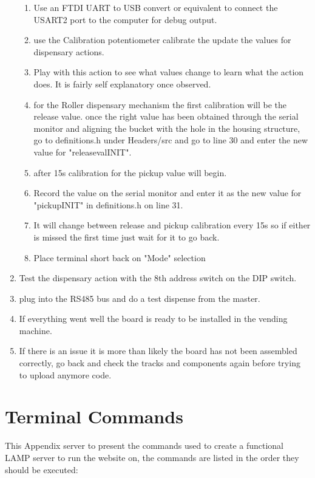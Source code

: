\documentclass[a4paper,11pt]{article}
\numberwithin{figure}{section}
\numberwithin{table}{section}
\begin{document}
\begin{appendices}
\begin{enumerate}
{\begin{enumerate}
  \item Use an FTDI UART to USB convert or equivalent to connect the USART2 port to the computer for debug output.
  \item use the Calibration potentiometer calibrate the update the values for dispensary actions. 
  \item Play with this action to see what values change to learn what the action does. It is fairly self explanatory once observed.
  \item for the Roller dispensary mechanism the first calibration will be the release value. once the right value has been obtained through the serial monitor and aligning the bucket with the hole in the housing structure, go to definitions.h under Headers/src and go to line 30 and enter the new value for "releasevalINIT".
  \item after 15s calibration for the pickup value will begin.
  \item Record the value on the serial monitor and enter it as the new value for "pickupINIT" in definitions.h on line 31.
  \item It will change between release and pickup calibration every 15s so if either is missed the first time just wait for it to go back.
  \item Place terminal short back on "Mode" selection
  \end{enumerate}}
  \item Test the dispensary action with the 8th address switch on the DIP switch.
  \item plug into the RS485 bus and do a test dispense from the master.
  \item If everything went well the board is ready to be installed in the vending machine.
  \item If there is an issue it is more than likely the board has not been assembled correctly, go back and check the tracks and components again before trying to upload anymore code.
\end{enumerate}

\newpage

\section{Terminal Commands}
\label{sec:PiCommands}

This Appendix server to present the commands used to create a functional LAMP server to run the website on, the commands are listed in the order they should be executed:


\end{appendices}
\end{document}
